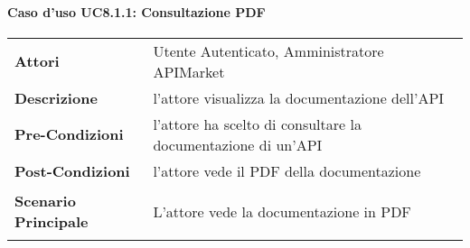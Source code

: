 \paragraph{Caso d'uso UC8.1.1: Consultazione PDF}
\label{UC8.1.1}

\renewcommand*{\arraystretch}{1.6}
\begin{longtable}{ l | p{11cm}}
	\hline
	\rowcolor{Gray}
	\multicolumn{2}{c}{UC8.1.1: Consultazione PDF} \\
	\hline
	\textbf{Attori} &Utente Autenticato, Amministratore APIMarket \\
	\textbf{Descrizione} & l'attore visualizza la documentazione dell'API \\
	\textbf{Pre-Condizioni} &  l'attore ha scelto di consultare la documentazione di un'API\\
	\textbf{Post-Condizioni}& l'attore vede il PDF della documentazione\\
	\textbf{Scenario Principale} & \begin{enumerate*}[label=(\arabic*.),itemjoin={\newline}]
		\item L'attore vede la documentazione in PDF
	\end{enumerate*}\\
\end{longtable}
